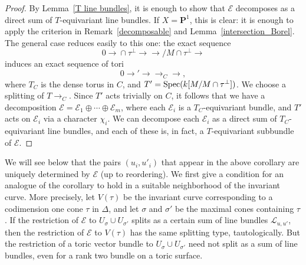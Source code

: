 \documentclass[12pt]{amsart}
\theoremstyle{definition}
\theoremstyle{remark}
\begin{document}
\begin{proof}
By Lemma~\ref{T line bundles}, it is enough to show that ${\mathcal{E}}$
decomposes as a direct sum of $T$-equivariant line bundles. If
$X={{\mathbf P}}^1$, this is clear: it is enough to apply the criterion in
Remark~\ref{decomposable} and Lemma~\ref{intersection_Borel}. The
general case reduces easily to this one: the exact sequence
$$0{\xrightarrow{\ \ }}\cap\tau^{\perp}{\xrightarrow{\ \ }}{\xrightarrow{\ \ }}/M\cap\tau^{\perp}{\xrightarrow{\ \ }}$$
induces an exact sequence of tori
$$0{\xrightarrow{\ \ }}'{\xrightarrow{\ \ }}{\xrightarrow{\ \ }}_C{\xrightarrow{\ \ }},$$
where $T_C$ is the dense torus in $C$, and $T'={\rm
Spec}(k[M/M\cap\tau^{\perp}])$. We choose a splitting of $T{\xrightarrow{\ \ }}_C$.
Since $T'$ acts trivially on $C$, it follows that we have a
decomposition ${\mathcal{E}}={\mathcal{E}}_1\oplus\cdots\oplus{\mathcal{E}}_m$, where each ${\mathcal{E}}_i$
is a $T_C$-equivariant bundle, and $T'$ acts on ${\mathcal{E}}_i$ via a character
$\chi_i$. We can decompose each ${\mathcal{E}}_i$ as a direct sum of
$T_C$-equivariant line bundles, and each of these is, in fact, a
$T$-equivariant subbundle of ${\mathcal{E}}$.
\end{proof}

We will see below that the pairs $(u_i,u'_i)$ that appear in the
above corollary are uniquely determined by ${\mathcal{E}}$ (up to reordering).
We first give a condition for an analogue of the corollary to hold
in a suitable neighborhood of the invariant curve. More precisely,
let $V(\tau)$ be the invariant curve corresponding to a codimension
one cone $\tau$ in $\Delta$, and let $\sigma$ and $\sigma'$ be the
maximal cones containing $\tau$.  If the restriction of ${\mathcal{E}}$ to
$U_\sigma \cup U_{\sigma'}$ splits as a certain sum of line bundles
${\mathcal{L}}_{u,u'}$, then the restriction of ${\mathcal{E}}$ to $V(\tau)$ has the
same splitting type, tautologically.  But the restriction of a toric
vector bundle to $U_\sigma \cup U_{\sigma'}$ need not split as a sum
of line bundles, even for a rank two bundle on a toric surface.
\end{document}
